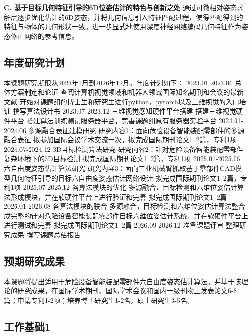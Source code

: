 \documentclass[12pt]{article}
\begin{document}
\textbf{C. 基于目标几何特征引导的6D位姿估计的特色与创新之处}
通过可微相对姿态求解层逐步优化估计的6D姿态，并将几何信息引入特征匹配过程，使得匹配得到的特征与物体的几何形状一致。进一步显式地使用深度神经网络编码几何特征作为姿态修正网络的参考信息。


\subsection{年度研究计划}

本课题研究期限从2023年1月到2026年12月。年度计划如下：
2023.01-2023.06		总体方案制定和论证
查阅计算机视觉领域和机器人领域国际知名期刊和会议的最新文献
开始对课题组的博士生和研究生进行python，pytorch以及三维视觉的入门培训
撰写算法设计书
2023.07-2023.12		三维视觉感知硬件平台搭建
搭建三维视觉硬件平台
搭建算法训练测试服务器平台，完善课题组原有服务器实验平台
2024.01-2024.06		多源融合表征建模研究
研究内容1：面向危险设备智能装配零部件的多源融合表征
拟参加国际会议学术交流一次，拟完成国际期刊论文1~2篇，专利1项
2024.07-2024.12		3D目标检测算法研究
研究内容2：针对危险设备智能装配零部件复杂环境下的3D目标检测
拟完成国际期刊论文1~2篇，专利1项
2025.01-2025.06		六自由度姿态估计算法研究
研究内容3：面向工业机械臂抓取基于零部件CAD模型几何特征引导的目标六自由度姿态估计网络设计
拟完成国际期刊论文1~2篇，专利1项
2025.07-2025.12		各算法模块的优化
多源融合，目标检测和六维位姿估计算法形成模块，并在软硬件平台上进行验证和完善
拟完成国际期刊论文1~2篇
2026.01-2026.08		各算法模块的联合
多源融合，目标检测和六维位姿估计算法整合成完整的针对危险设备智能装配零部件目标六维位姿估计系统，并在软硬件平台上进行测试和完善
拟完成国际期刊论文1~2篇
2026.09-2026.12		准备课题评审
整理研究成果
撰写课题总结报告

\subsection{预期研究成果}

本课题将提出适用于危险设备智能装配零部件六自由度姿态估计算法。并基于该理论的研究成果，在国际学术期刊、国际学术会议和国内一级刊物上发表论文6-8篇；申请专利1-2项；培养博士研究生1-2名，硕士研究生3-5名。





\subsection{工作基础1}
\end{document}
